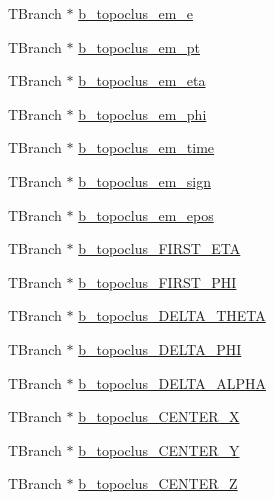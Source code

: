\begin{DoxyCompactItemize}
\item 
T\+Branch $\ast$ \hyperlink{classCollectionTree_aa6eab3a3c301f86977c0c359592f68ac}{b\+\_\+topoclus\+\_\+em\+\_\+e}
\item 
T\+Branch $\ast$ \hyperlink{classCollectionTree_a5cd24cfc1fd077bc3f1bb12045562e35}{b\+\_\+topoclus\+\_\+em\+\_\+pt}
\item 
T\+Branch $\ast$ \hyperlink{classCollectionTree_a2d142c868b7a2fc1eeaa7e71b57a73fc}{b\+\_\+topoclus\+\_\+em\+\_\+eta}
\item 
T\+Branch $\ast$ \hyperlink{classCollectionTree_af2f52044ac03cd9306fde848bd60b030}{b\+\_\+topoclus\+\_\+em\+\_\+phi}
\item 
T\+Branch $\ast$ \hyperlink{classCollectionTree_a02b67b8f3dc35b5383163dfc454ff53e}{b\+\_\+topoclus\+\_\+em\+\_\+time}
\item 
T\+Branch $\ast$ \hyperlink{classCollectionTree_a4a0d22ea48176756069ca3987f28b941}{b\+\_\+topoclus\+\_\+em\+\_\+sign}
\item 
T\+Branch $\ast$ \hyperlink{classCollectionTree_ab3a58257c9bab2257bd7b5e539398e31}{b\+\_\+topoclus\+\_\+em\+\_\+epos}
\item 
T\+Branch $\ast$ \hyperlink{classCollectionTree_ac49017079551584e93cfb69ec5f54ef5}{b\+\_\+topoclus\+\_\+\+F\+I\+R\+S\+T\+\_\+\+E\+TA}
\item 
T\+Branch $\ast$ \hyperlink{classCollectionTree_a3b39c71967d250a27021b68f8cec5660}{b\+\_\+topoclus\+\_\+\+F\+I\+R\+S\+T\+\_\+\+P\+HI}
\item 
T\+Branch $\ast$ \hyperlink{classCollectionTree_af718a211021e224d9511b134a42b21f5}{b\+\_\+topoclus\+\_\+\+D\+E\+L\+T\+A\+\_\+\+T\+H\+E\+TA}
\item 
T\+Branch $\ast$ \hyperlink{classCollectionTree_aecd131e12d69a4a33ba2fc5675f69948}{b\+\_\+topoclus\+\_\+\+D\+E\+L\+T\+A\+\_\+\+P\+HI}
\item 
T\+Branch $\ast$ \hyperlink{classCollectionTree_a8366603bd1658516c96ad69f1f57028f}{b\+\_\+topoclus\+\_\+\+D\+E\+L\+T\+A\+\_\+\+A\+L\+P\+HA}
\item 
T\+Branch $\ast$ \hyperlink{classCollectionTree_aa259bb7eb2d9fab7d3ad64606bba0c0b}{b\+\_\+topoclus\+\_\+\+C\+E\+N\+T\+E\+R\+\_\+X}
\item 
T\+Branch $\ast$ \hyperlink{classCollectionTree_ac253012fc9852a2dfdb3990594cb4fb1}{b\+\_\+topoclus\+\_\+\+C\+E\+N\+T\+E\+R\+\_\+Y}
\item 
T\+Branch $\ast$ \hyperlink{classCollectionTree_adfd02ce514cd5756e9765bde6df68c6b}{b\+\_\+topoclus\+\_\+\+C\+E\+N\+T\+E\+R\+\_\+Z}
\item 

\end{DoxyCompactItemize}
